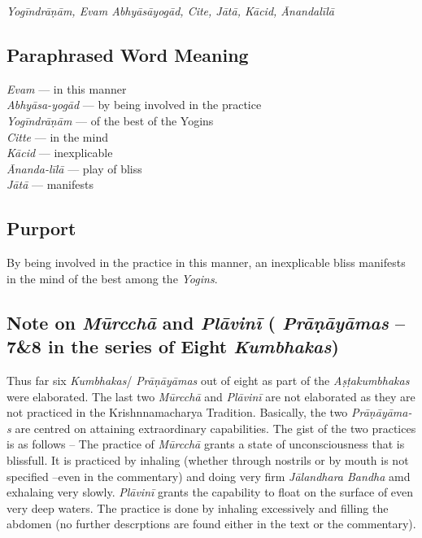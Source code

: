 \textit{Yogīndrāṇām, Evam Abhyāsāyogād, Cite, Jātā, Kācid, Ānandalīlā}

\subsection*{Paraphrased Word Meaning}

\begin{multicols}{2}
\textit{Evam} --- in this manner \\
\textit{Abhyāsa-yogād} ---  by being involved in the practice \\
\textit{Yogīndrāṇām} --- of the best of the Yogins \\
\textit{Citte}  --- in the mind \\
\textit{Kācid} --- inexplicable \\
\textit{Ānanda-līlā} --- play of bliss \\
\textit{Jātā} ---  manifests
\end{multicols}

\subsection*{Purport}

By being involved in the practice in this manner, an inexplicable bliss manifests in the mind of the best among the \textit{Yogins}.

\subsection*{Note on  \textit{Mūrcchā} and  \textit{Plāvinī}   ( \textit{Prāṇāyāmas} – 7\&8 in the series of Eight \textit{Kumbhakas})}


Thus far six \textit{Kumbhakas}/ \textit{Prāṇāyāmas} out of eight as part of the  \textit{Aṣṭakumbhakas} were elaborated. The last two  \textit{Mūrcchā}  and  \textit{Plāvinī} are not elaborated as they are not practiced in the Krishnnamacharya Tradition. Basically, the two \textit{Prāṇāyāma-s} are centred on attaining extraordinary capabilities.  The gist of the two practices is as follows – The practice of  \textit{Mūrcchā}  grants a state of unconsciousness that is blissfull. It is practiced by inhaling (whether through nostrils or by mouth is not specified –even in the commentary) and doing very firm  \textit{Jālandhara Bandha} amd exhalaing very slowly.   \textit{Plāvinī} grants the capability to float on the surface of even very deep waters. The practice is done by inhaling excessively and filling  the abdomen (no further descrptions are found either in the text or the commentary). 
\newpage

